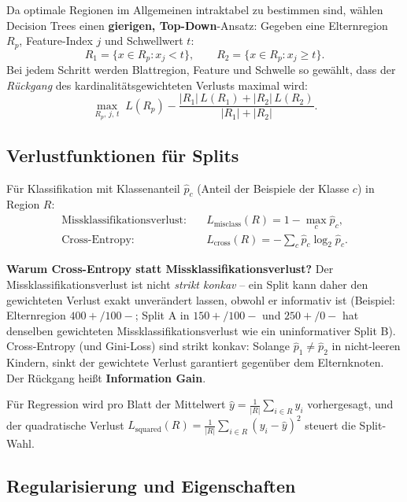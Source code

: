 \documentclass[11pt]{article}
\theoremstyle{csthm}
\theoremstyle{csdef}
\begin{document}
Da optimale Regionen im Allgemeinen intraktabel zu bestimmen sind, wählen
Decision Trees einen \textbf{gierigen, Top-Down}-Ansatz: Gegeben eine
Elternregion $R_p$, Feature-Index $j$ und Schwellwert $t$:
\begin{equation}
  R_1 = \{x \in R_p : x_j < t\}, \qquad R_2 = \{x \in R_p : x_j \geq t\}.
\end{equation}
Bei jedem Schritt werden Blattregion, Feature und Schwelle so gewählt, dass
der \emph{Rückgang} des kardinalitätsgewichteten Verlusts maximal wird:
\begin{equation}
  \max_{R_p,\,j,\,t} \; L(R_p) - \frac{|R_1|\,L(R_1) + |R_2|\,L(R_2)}{|R_1|+|R_2|}.
\end{equation}

\subsection{Verlustfunktionen für Splits}

Für Klassifikation mit Klassenanteil $\hat p_c$ (Anteil der Beispiele der
Klasse $c$) in Region $R$:
\begin{align}
  \text{Missklassifikationsverlust:} &\quad L_\text{misclass}(R) = 1 - \max_c \hat p_c, \\
  \text{Cross-Entropy:} &\quad L_\text{cross}(R) = -\sum_c \hat p_c \log_2 \hat p_c.
\end{align}

\begin{tcolorbox}[defstyle]
\textbf{Warum Cross-Entropy statt Missklassifikationsverlust?} Der
Missklassifikationsverlust ist nicht \emph{strikt konkav} -- ein Split kann
daher den gewichteten Verlust exakt unverändert lassen, obwohl er informativ
ist (Beispiel: Elternregion $400{+}/100{-}$; Split A in $150{+}/100{-}$ und
$250{+}/0{-}$ hat denselben gewichteten Missklassifikationsverlust wie ein
uninformativer Split B). Cross-Entropy (und Gini-Loss) sind strikt konkav:
Solange $\hat p_1 \neq \hat p_2$ in nicht-leeren Kindern, sinkt der
gewichtete Verlust garantiert gegenüber dem Elternknoten. Der Rückgang heißt
\textbf{Information Gain}.
\end{tcolorbox}

Für Regression wird pro Blatt der Mittelwert
$\hat y = \tfrac{1}{|R|}\sum_{i\in R} y_i$ vorhergesagt, und der quadratische
Verlust $L_\text{squared}(R) = \tfrac{1}{|R|}\sum_{i \in R}(y_i-\hat y)^2$
steuert die Split-Wahl.

\subsection{Regularisierung und Eigenschaften}
\end{document}
